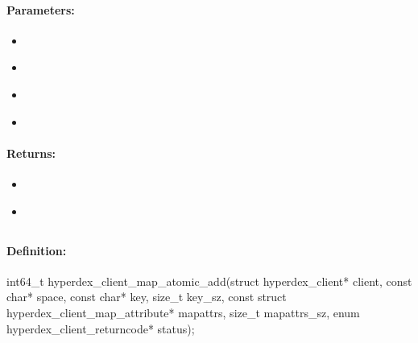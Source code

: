 \paragraph{Parameters:}
\begin{itemize}[noitemsep]
\item {}\\

\item {}\\

\item {}\\

\item {}\\

\end{itemize}

\paragraph{Returns:}
\begin{itemize}[noitemsep]
\item {}\\

\item {}\\

\end{itemize}

\pagebreak
\subsection{}
\label{api:c:map_atomic_add}


\paragraph{Definition:}
\begin{ccode}
int64_t hyperdex_client_map_atomic_add(struct hyperdex_client* client,
        const char* space,
        const char* key, size_t key_sz,
        const struct hyperdex_client_map_attribute* mapattrs, size_t mapattrs_sz,
        enum hyperdex_client_returncode* status);
\end{ccode}

